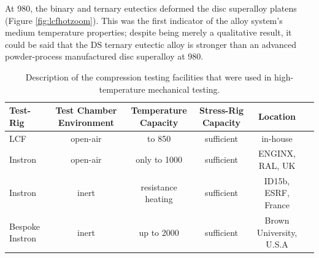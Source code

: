 At 980\celsius, the binary and ternary eutectics deformed the disc superalloy platens (Figure \ref{fig:lcfhotzoom}).  This was the first indicator of the alloy system’s medium temperature properties; despite being merely a qualitative result, it could be said that the DS ternary eutectic alloy is stronger than an advanced powder-process manufactured disc superalloy at 980\celsius.

%
\begin{landscape}
\begin{table}[htdp]
\begin{center}
\begin{tabular}{lccccc}
\hline\hline
Test-Rig 		&  Test Chamber Environment&Temperature Capacity&	Stress-Rig Capacity&	Location	\\
\hline
LCF 		&open-air 	&	to 850\celsius	&  sufficient 	&in-house\\
Instron	&open-air	& 	only to 1000\celsius					&sufficient		&ENGINX, RAL, UK\\
Instron	&inert									&	resistance heating	&sufficient		&ID15b, ESRF, France\\
Bespoke Instron&inert							&up to 2000\celsius						&sufficient		&Brown University,  U.S.A \\
\hline\hline
\end{tabular}
\end{center}
\caption{Description of the compression testing facilities that were used in high-temperature mechanical testing.}
\label{tab:compress}
\end{table}
\end{landscape}


